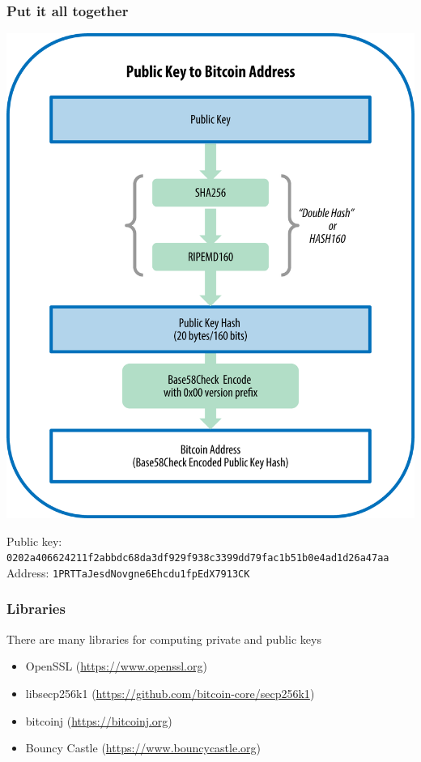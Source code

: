 \documentclass[11pt]{beamer}  %
\begin{document}
\begin{frame}\frametitle{Put it all together}

  \begin{center}
    \includegraphics[scale=0.52,clip=false]{pictures/mbc2_0405.png}
  \end{center}

  \begin{center}
    Public key: {\scriptsize\texttt{0202a406624211f2abbdc68da3df929f938c3399dd79fac1b51b0e4ad1d26a47aa}}\\
    Address: \texttt{1PRTTaJesdNovgne6Ehcdu1fpEdX7913CK}
  \end{center}

\end{frame}

\begin{frame}\frametitle{Libraries}

  \begin{greenbox}{There are many libraries for computing private and public keys}
  \begin{itemize}
  \item OpenSSL (\url{https://www.openssl.org})
  \item libsecp256k1 (\url{https://github.com/bitcoin-core/secp256k1})
  \item bitcoinj (\url{https://bitcoinj.org})
  \item Bouncy Castle (\url{https://www.bouncycastle.org})
  \end{itemize}
  \end{greenbox}

\end{frame}
\end{document}
